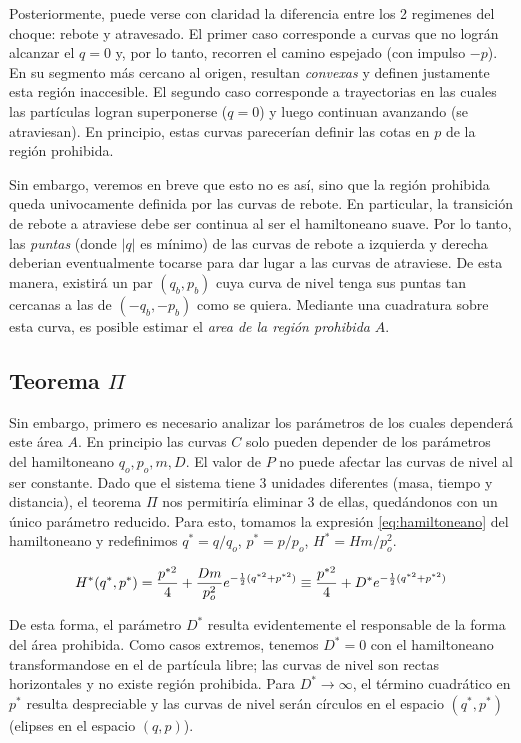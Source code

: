 \documentclass[twoside, 12pt]{article}
\begin{document}
Posteriormente, puede verse con claridad la diferencia entre los 2 regimenes del choque: rebote y atravesado.
El primer caso corresponde a curvas que no lográn alcanzar el $q=0$ y, por lo tanto, recorren el camino espejado (con impulso $-p$).
En su segmento más cercano al origen, resultan \textit{convexas} y definen justamente esta región inaccesible.
El segundo caso corresponde a trayectorias en las cuales las partículas logran superponerse ($q=0$) y luego continuan avanzando (se atraviesan).
En principio, estas curvas parecerían definir las cotas en $p$ de la región prohibida.

Sin embargo, veremos en breve que esto no es así, sino que la región prohibida queda univocamente definida por las curvas de rebote.
En particular, la transición de rebote a atraviese debe ser continua al ser el hamiltoneano suave.
Por lo tanto, las \textit{puntas} (donde $|q|$ es mínimo) de las curvas de rebote a izquierda y derecha deberian eventualmente tocarse para dar lugar a las curvas de atraviese.
De esta manera, existirá un par $(q_b, p_b)$ cuya curva de nivel tenga sus puntas tan cercanas a las de $(-q_b, -p_b)$ como se quiera.
Mediante una cuadratura sobre esta curva, es posible estimar el \textit{area de la región prohibida} $A$.

\subsection{Teorema $\Pi$}

Sin embargo, primero es necesario analizar los parámetros de los cuales dependerá este área $A$.
En principio las curvas $C$ solo pueden depender de los parámetros del hamiltoneano $q_o, p_o, m, D$. El valor de $P$ no puede afectar las curvas de nivel al ser constante.
Dado que el sistema tiene 3 unidades diferentes (masa, tiempo y distancia), el teorema $\Pi$ nos permitiría eliminar 3 de ellas, quedándonos con un único parámetro reducido.
Para esto, tomamos la expresión \eqref{eq:hamiltoneano} del hamiltoneano y redefinimos $q^* = q/q_o$, $p^* = p/p_o$, $H^* = Hm/p_o^2$.

\begin{equation}{\label{eq:ham_red}}
 H^*(q^*, p^*) = \frac{p^{*2}}{4} + \frac{Dm}{p_o^2}e^{-\frac{1}{2}(q^{*2}+p^{*2})} \equiv \frac{p^{*2}}{4} + D^* e^{-\frac{1}{2}(q^{*2}+p^{*2})}
\end{equation}

De esta forma, el parámetro $D^*$ resulta evidentemente el responsable de la forma del área prohibida. 
Como casos extremos, tenemos $D^* = 0$ con el hamiltoneano transformandose en el de partícula libre; las curvas de nivel son rectas horizontales y no existe región prohibida.
Para $D^* \rightarrow \infty$, el término cuadrático en $p^*$ resulta despreciable y las curvas de nivel serán círculos en el espacio $(q^*, p^*)$ (elipses en el espacio $(q,p)$).
\end{document}
